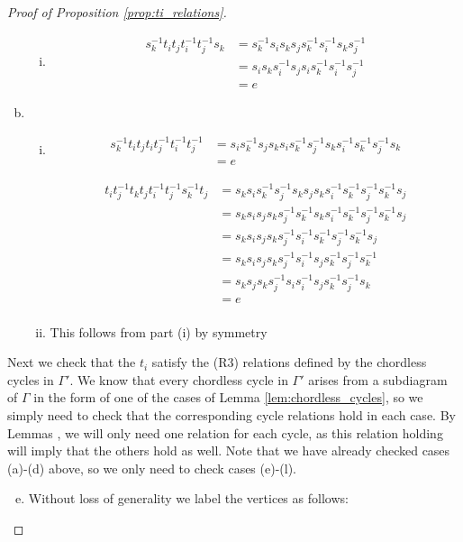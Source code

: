 \documentclass[11pt]{amsart}
\theoremstyle{definition}
\begin{document}
\begin{proof}[Proof of Proposition \ref{prop:ti_relations}]
\begin{enumerate}[a)]
\begin{enumerate}[i)]
\item
\begin{align*}
s_k^{-1}t_it_jt_i^{-1}t_j^{-1}s_k &= s_k^{-1}s_is_ks_js_k^{-1}s_i^{-1}s_ks_j^{-1}\\
&= s_is_ks_i^{-1}s_js_is_k^{-1}s_i^{-1}s_j^{-1}\\
&= e
\end{align*}

\end{enumerate}
\item
\begin{enumerate}[i)]
\item
\begin{align*}
s_k^{-1}t_it_jt_it_j^{-1}t_i^{-1}t_j^{-1} &= s_is_k^{-1}s_js_ks_is_k^{-1}s_j^{-1}s_ks_i^{-1}s_k^{-1}s_j^{-1}s_k\\
&= e
\end{align*}

\begin{align*}
t_it_j^{-1}t_kt_jt_i^{-1}t_j^{-1}s_k^{-1}t_j &= s_ks_is_k^{-1}s_j^{-1}s_ks_js_ks_i^{-1}s_k^{-1}s_j^{-1}s_k^{-1}s_j\\
&= s_ks_is_js_ks_j^{-1}s_k^{-1}s_ks_i^{-1}s_k^{-1}s_j^{-1}s_k^{-1}s_j\\
&= s_ks_is_js_ks_j^{-1}s_i^{-1}s_k^{-1}s_j^{-1}s_k^{-1}s_j\\
&= s_ks_is_js_ks_j^{-1}s_i^{-1}s_js_k^{-1}s_j^{-1}s_k^{-1}\\
&= s_ks_js_ks_j^{-1}s_is_i^{-1}s_js_k^{-1}s_j^{-1}s_k\\
&= e\\
\end{align*}

\item This follows from part (i) by symmetry
\end{enumerate}
\end{enumerate}

Next we check that the $t_i$ satisfy the (R3) relations defined by the chordless cycles in $\Gamma'$.  We know that every chordless cycle in $\Gamma'$ arises from a subdiagram of $\Gamma$ in the form of one of the cases of Lemma \ref{lem:chordless_cycles}, so we simply need to check that the corresponding cycle relations hold in each case.  By Lemmas , we will only need one relation for each cycle, as this relation holding will imply that the others hold as well.  Note that we have already checked cases (a)-(d) above, so we only need to check cases (e)-(l).

\begin{enumerate}[a)]
\setcounter{enumi}{4}
\item
Without loss of generality we label the vertices as follows:


\end{enumerate}
\end{proof}
\end{document}

